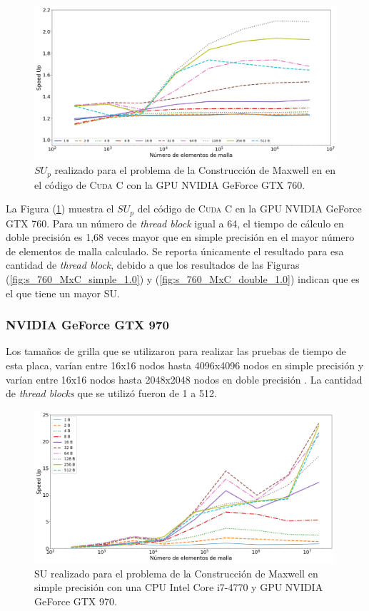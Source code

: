 \begin{figure}[h!]
	\centering
	\includegraphics[width=\textwidth]{figs/cap4/c_760_MxC_cuda_10}
	\caption{$SU_p$ realizado para el problema de la Construcción de Maxwell en en el código de \textsc{Cuda C} con la GPU NVIDIA GeForce GTX 760.} 
	\label{fig:c_760_MxC_cuda_10}	
\end{figure}

La Figura (\ref{fig:c_760_MxC_cuda_10}) muestra el ${SU}_p$ del código de \textsc{Cuda C} en la GPU NVIDIA GeForce GTX 760. Para un número de \textit{thread block} igual a 64, el tiempo de cálculo en doble precisión es 1,68 veces mayor que en simple precisión en el mayor número de elementos de malla calculado. Se reporta únicamente el resultado para esa cantidad de \textit{thread block}, debido a que los resultados de las Figuras (\ref{fig:s_760_MxC_simple_1.0}) y (\ref{fig:s_760_MxC_double_1.0}) indican que es el que tiene un mayor SU.


\subsubsection{NVIDIA GeForce GTX 970}

Los tamaños de grilla que se utilizaron para realizar las pruebas de tiempo de esta placa, varían entre 16x16 nodos hasta 4096x4096 nodos en simple precisión y varían entre 16x16 nodos hasta 2048x2048 nodos en doble precisión . La cantidad de \textit{thread blocks} que se utilizó fueron de 1 a 512.



\begin{figure}[htbp]
	\centering
	\includegraphics[width=0.99\textwidth]{figs/cap4/s_970_MxC_simple_10}
	\caption{SU realizado para el problema de la Construcción de Maxwell en simple precisión con una CPU Intel Core i7-4770 y GPU NVIDIA GeForce GTX 970.} 
	\label{fig:s_970_MxC_simple_10}	
\end{figure}

